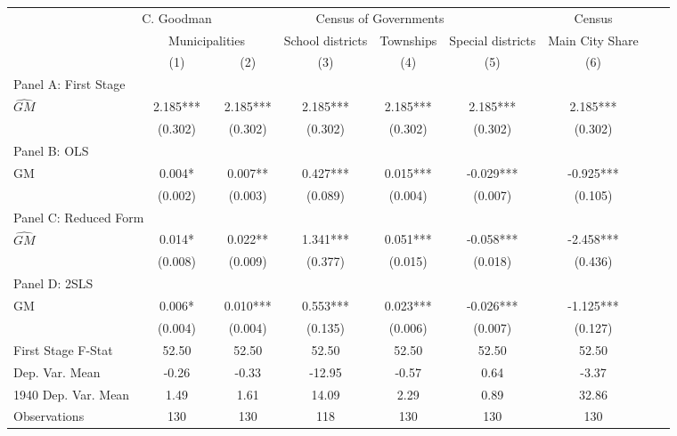  \begin{tabular}{l*{8}{c}} \toprule
&\multicolumn{1}{c}{C. Goodman}&\multicolumn{4}{c}{Census of Governments}&\multicolumn{1}{c}{Census}\\\cmidrule(lr){2-2}\cmidrule(lr){3-6}\cmidrule(lr){7-7}
&\multicolumn{2}{c}{Municipalities}&\multicolumn{1}{c}{School districts}&\multicolumn{1}{c}{Townships}&\multicolumn{1}{c}{Special districts}&\multicolumn{1}{c}{Main City Share}\\\cmidrule(lr){2-3}\cmidrule(lr){4-6}\cmidrule(lr){7-7}
&\multicolumn{1}{c}{(1)}&\multicolumn{1}{c}{(2)}&\multicolumn{1}{c}{(3)}&\multicolumn{1}{c}{(4)}&\multicolumn{1}{c}{(5)}&\multicolumn{1}{c}{(6)}\\
\cmidrule(lr){1-7}
\multicolumn{6}{l}{Panel A: First Stage}\\
\cmidrule(lr){1-7}
$\widehat{GM}$  &    2.185***&    2.185***&    2.185***&    2.185***&    2.185***&    2.185***\\
                &  (0.302)   &  (0.302)   &  (0.302)   &  (0.302)   &  (0.302)   &  (0.302)   \\
\cmidrule(lr){1-7}
\multicolumn{6}{l}{Panel B: OLS}\\
\cmidrule(lr){1-7}
GM              &    0.004*  &    0.007** &    0.427***&    0.015***&   -0.029***&   -0.925***\\
                &  (0.002)   &  (0.003)   &  (0.089)   &  (0.004)   &  (0.007)   &  (0.105)   \\
\cmidrule(lr){1-7}
\multicolumn{6}{l}{Panel C: Reduced Form}\\
\cmidrule(lr){1-7}
$\widehat{GM}$  &    0.014*  &    0.022** &    1.341***&    0.051***&   -0.058***&   -2.458***\\
                &  (0.008)   &  (0.009)   &  (0.377)   &  (0.015)   &  (0.018)   &  (0.436)   \\
\cmidrule(lr){1-7}
\multicolumn{6}{l}{Panel D: 2SLS}\\
\cmidrule(lr){1-7}
GM              &    0.006*  &    0.010***&    0.553***&    0.023***&   -0.026***&   -1.125***\\
                &  (0.004)   &  (0.004)   &  (0.135)   &  (0.006)   &  (0.007)   &  (0.127)   \\
\midrule
First Stage F-Stat&    52.50   &    52.50   &    52.50   &    52.50   &    52.50   &    52.50   \\
Dep. Var. Mean  &    -0.26   &    -0.33   &   -12.95   &    -0.57   &     0.64   &    -3.37   \\
1940 Dep. Var. Mean&     1.49   &     1.61   &    14.09   &     2.29   &     0.89   &    32.86   \\
Observations    &      130   &      130   &      118   &      130   &      130   &      130   \\
 \bottomrule \end{tabular}
